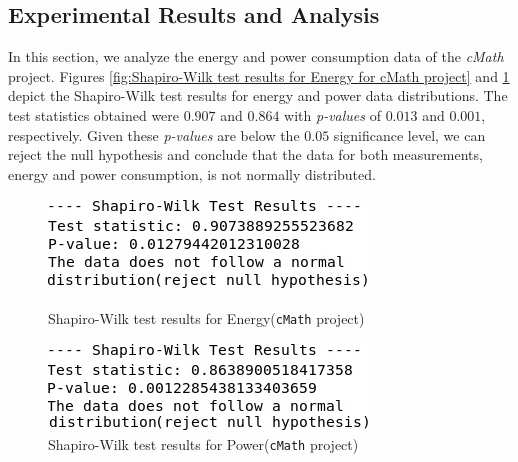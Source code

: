 
\subsection{Experimental Results and Analysis} 

In this section, we analyze the energy and power consumption data of the \textit{cMath} project. Figures \ref{fig:Shapiro-Wilk test results for Energy for cMath project} and \ref{fig:Shapiro-Wilk test results for Power for cMath project} depict the Shapiro-Wilk test results for energy and power data distributions. 
%
The test statistics obtained were $0.907$ and $0.864$ with \textit{p-values} of $0.013$ and $0.001$, respectively. Given these \textit{p-values} are below the $0.05$ significance level, we can reject the null hypothesis and conclude that the data for both measurements, \ie energy and power consumption, is not normally distributed.

\begin{figure}[h!]
  \centering
  \begin{minipage}[b]{0.49\textwidth}
    \includegraphics[width=.8\linewidth]{img/cMath_project_shapiro_test_energy_update.png}
    \caption{Shapiro-Wilk test results for Energy(\texttt{cMath} project)}
    \label{fig:Shapiro-Wilk test results for Energy for cMath project}
  \end{minipage}
  \hfill
  \begin{minipage}[b]{0.49\textwidth}
    \includegraphics[width=.8\linewidth]{img/cMath_project_shapiro_test_power_update.png}
    \caption{Shapiro-Wilk test results for Power(\texttt{cMath} project)}
    \label{fig:Shapiro-Wilk test results for Power for cMath project}
  \end{minipage}
\end{figure}

